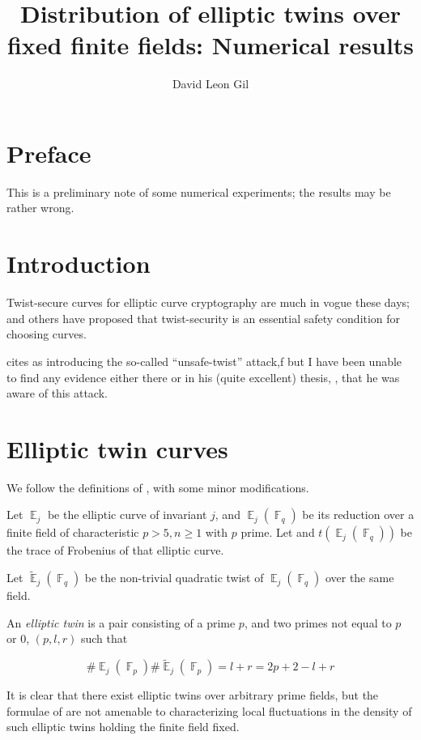 \documentclass[11pt,fleqn]{article}
\title{Distribution of elliptic twins over fixed finite fields: Numerical results}
\author{David Leon Gil}
\newcommand{\Ej}{\ensuremath{\BbbE_j} }
\newcommand{\Ejfq}{\ensuremath{\BbbE_j(\BbbF_q)} }
\newcommand{\Ejfqt}{\ensuremath{\widetilde{\BbbE}_j(\BbbF_q)} }
\newcommand{\Ejfp}{\ensuremath{\BbbE_j(\BbbF_p)} }
\newcommand{\Ejfpt}{\ensuremath{\widetilde{\BbbE}_j(\BbbF_p)} }
\begin{document}
\maketitle

\section{Preface}

This is a preliminary note of some numerical experiments; the results
may be rather wrong.

\section{Introduction}

Twist-secure curves for elliptic curve cryptography are much in vogue
these days; \cite{curve25519} and others have proposed that twist-security
is an essential safety condition for choosing curves.

\cite{curve25519} cites \cite{KaliskiJCryptology} as introducing the
so-called ``unsafe-twist'' attack,f but I have been unable to find any
evidence either there or in his (quite excellent) thesis, \cite{KaliskiThesis},
that he was aware of this attack.

\section{Elliptic twin curves}

We follow the definitions of \autocite{ShparlinskiSutantyo}, with some minor
modifications.

Let $\Ej$ be the elliptic curve of invariant $j$, and $\Ejfq$ be its reduction
over a finite field of characteristic $p > 5, n \geq 1$ with $p$ prime. Let
and $t(\Ejfq)$ be the trace of Frobenius of that elliptic curve.

Let $\Ejfqt$ be the non-trivial quadratic twist of $\Ejfq$ over the same field.

An \emph{elliptic twin} is a pair consisting of a prime $p$, and two primes
not equal to $p$ or $0$, $(p, {l, r})$ such that

\begin{equation}
\#\Ejfp \#\Ejfpt = l + r = 2 p + 2 - l + r
\end{equation}

It is clear that there exist elliptic twins over arbitrary prime fields, but
the formulae of \autocite{ShparlinskiSutantyo} are not amenable to characterizing
local fluctuations in the density of such elliptic twins holding the finite
field fixed.
\end{document}
